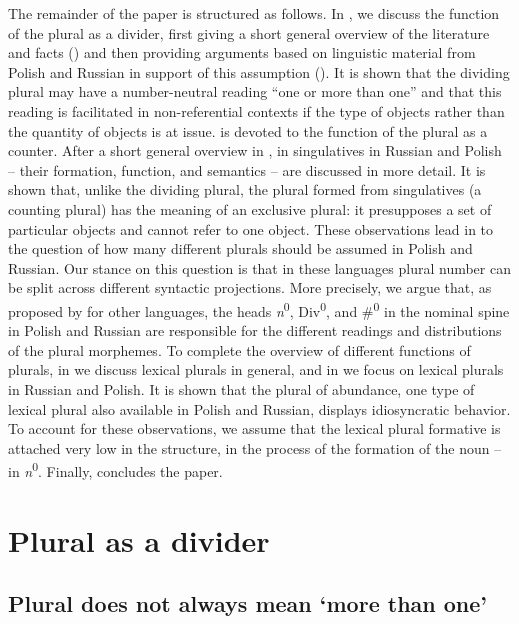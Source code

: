 \documentclass[output=paper,colorlinks,citecolor=brown,
]{langscibook}
\begin{document}
The remainder of the paper is structured as follows. In , we discuss the function of the plural as a divider, first giving a short general overview of the literature and facts () and then providing arguments based on linguistic material from Polish and Russian in support of this assumption (). It is shown that the dividing plural may have a number-neutral reading ``one or more than one'' and that this reading is facilitated in non-referential contexts if the type of objects rather than the quantity of objects is at issue.  is devoted to the function of the plural as a counter. After a short general overview in , in  singulatives in Russian and Polish -- their formation, function, and semantics -- are discussed in more detail. It is shown that, unlike the dividing plural, the plural formed from singulatives (a counting plural) has the meaning of an exclusive plural: it presupposes a set of particular objects and cannot refer to one object. These observations lead in  to the question of how many different plurals should be assumed in Polish and Russian. Our stance on this question is that in these languages plural number can be split across different syntactic projections. More precisely, we argue that, as proposed by \citet{Mathieu2014} for other languages, the heads \textit{n}\textsuperscript{0}, Div\textsuperscript{0}, and \#\textsuperscript{0} in the nominal spine in Polish and Russian are responsible for the different readings and distributions of the plural morphemes. To complete the overview of different functions of plurals, in  we discuss lexical plurals in general, and in  we focus on lexical plurals in Russian and Polish. It is shown that the plural of abundance, one type of lexical plural also available in Polish and Russian, displays idiosyncratic behavior. To account for these observations, we assume that the lexical plural formative is attached very low in the structure, in the process of the formation of the noun -- in \textit{n}\textsuperscript{0}. Finally,  concludes the paper.


\section{Plural as a divider}\label{sec:2}
\subsection{Plural does not always mean `more than one'}\label{sec:2.1}
\end{document}
